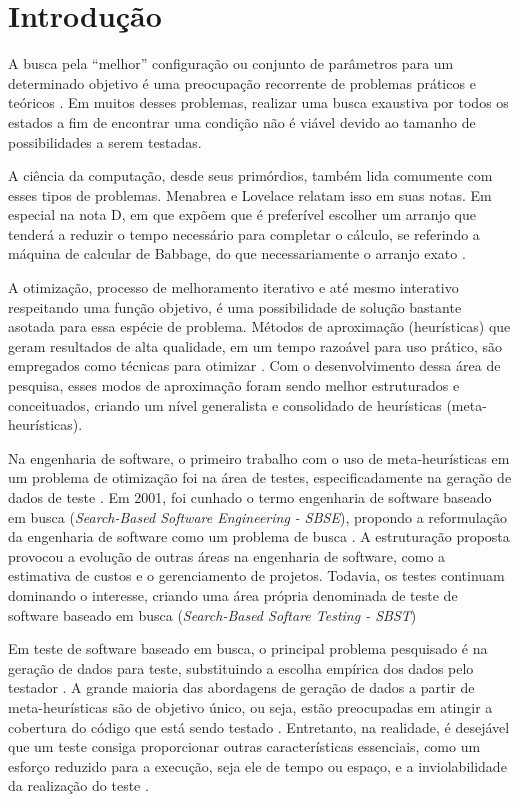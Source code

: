 \chapter[Introdução]{Introdução}

A busca pela ``melhor'' configuração ou conjunto de parâmetros para um determinado objetivo é uma preocupação recorrente de problemas práticos e teóricos \cite{combinatorialoptimization1998}. Em muitos desses problemas, realizar uma busca exaustiva por todos os estados a fim de encontrar uma condição não é viável devido ao tamanho de possibilidades a serem testadas. 

A ciência da computação, desde seus primórdios, também lida comumente com esses tipos de problemas. Menabrea e Lovelace relatam isso em suas notas. Em especial na nota D, em que expõem que é preferível escolher um arranjo que tenderá a reduzir o tempo necessário para completar o cálculo, se referindo a
máquina de calcular de Babbage, do que necessariamente o arranjo exato \cite{menabrea1842sketch}.

A otimização, processo de melhoramento iterativo e até mesmo interativo respeitando uma função objetivo, é uma possibilidade de solução bastante asotada para essa espécie de problema. Métodos de aproximação (heurísticas) que geram resultados de alta qualidade, em um tempo razoável para uso prático, são empregados como técnicas para otimizar \cite{gendreau2005metaheuristics}. Com o desenvolvimento dessa área de pesquisa, esses modos de aproximação foram sendo melhor estruturados e conceituados, criando um nível generalista e consolidado de heurísticas (meta-heurísticas).

Na engenharia de software, o primeiro trabalho com o uso de meta-heurísticas em um problema de otimização foi na área de testes, especificadamente na geração de dados de teste \cite{miller1976automatic}. Em 2001, foi cunhado o termo engenharia de software baseado em busca (\textit{Search-Based Software Engineering - SBSE}), propondo a reformulação da engenharia de software como um problema de busca \cite{harman2001search}. A estruturação proposta provocou a evolução de outras áreas na engenharia de software, como a estimativa de custos e o gerenciamento de projetos. Todavia, os testes continuam dominando o interesse, criando uma área própria denominada de teste de software baseado em busca (\textit{Search-Based Softare Testing - SBST}) \cite{harman2012search}

Em teste de software baseado em busca, o principal problema pesquisado é na geração de dados para teste, substituindo a escolha empírica dos dados pelo testador \cite{mcminn2004search}. A grande maioria das abordagens de geração de dados a partir de meta-heurísticas são de objetivo único, ou seja, estão preocupadas em atingir a cobertura do código que está sendo testado \cite{harman2015achievements}. Entretanto, na realidade, é desejável que um teste consiga proporcionar outras características essenciais, como um esforço reduzido para a execução, seja ele de tempo ou espaço, e a inviolabilidade da realização do teste \cite{harman2015achievements}.

